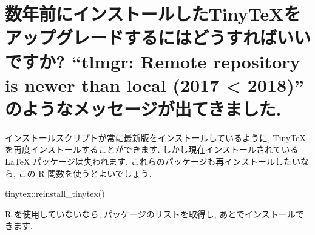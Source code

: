 \documentclass[
  xelatex,ja=standard,jafont=noto]{bxjsreport}
\newenvironment{Shaded}{\begin{snugshade}}{\end{snugshade}}
\newcommand{\AttributeTok}[1]{\textcolor[rgb]{0.77,0.63,0.00}{#1}}
\newcommand{\CommentTok}[1]{\textcolor[rgb]{0.56,0.35,0.01}{\textit{#1}}}
\newcommand{\ExtensionTok}[1]{#1}
\newcommand{\FunctionTok}[1]{\textcolor[rgb]{0.00,0.00,0.00}{#1}}
\newcommand{\KeywordTok}[1]{\textcolor[rgb]{0.13,0.29,0.53}{\textbf{#1}}}
\newcommand{\NormalTok}[1]{#1}
\newcommand{\SpecialCharTok}[1]{\textcolor[rgb]{0.00,0.00,0.00}{#1}}
\newcommand{\StringTok}[1]{\textcolor[rgb]{0.31,0.60,0.02}{#1}}
\newcommand{\VariableTok}[1]{\textcolor[rgb]{0.00,0.00,0.00}{#1}}
\begin{document}
\hypertarget{ux6570ux5e74ux524dux306bux30a4ux30f3ux30b9ux30c8ux30fcux30ebux3057ux305ftinytexux3092ux30a2ux30c3ux30d7ux30b0ux30ecux30fcux30c9ux3059ux308bux306bux306fux3069ux3046ux3059ux308cux3070ux3044ux3044ux3067ux3059ux304b-tlmgr-remote-repository-is-newer-than-local-2017-2018-ux306eux3088ux3046ux306aux30e1ux30c3ux30bbux30fcux30b8ux304cux51faux3066ux304dux307eux3057ux305f.}{%
\section{数年前にインストールしたTinyTeXをアップグレードするにはどうすればいいですか?
``tlmgr: Remote repository is newer than local (2017 \textless{} 2018)''
のようなメッセージが出てきました.}\label{ux6570ux5e74ux524dux306bux30a4ux30f3ux30b9ux30c8ux30fcux30ebux3057ux305ftinytexux3092ux30a2ux30c3ux30d7ux30b0ux30ecux30fcux30c9ux3059ux308bux306bux306fux3069ux3046ux3059ux308cux3070ux3044ux3044ux3067ux3059ux304b-tlmgr-remote-repository-is-newer-than-local-2017-2018-ux306eux3088ux3046ux306aux30e1ux30c3ux30bbux30fcux30b8ux304cux51faux3066ux304dux307eux3057ux305f.}}

インストールスクリプトが常に最新版をインストールしているように, TinyTeX
を再度インストールすることができます. しかし現在インストールされている
LaTeX パッケージは失われます.
これらのパッケージも再インストールしたいなら, この R
関数を使うとよいでしょう.

\begin{Shaded}
\begin{Highlighting}[numbers=left,,]
\NormalTok{tinytex}\SpecialCharTok{::}\FunctionTok{reinstall\_tinytex}\NormalTok{()}
\end{Highlighting}
\end{Shaded}

R を使用していないなら, パッケージのリストを取得し,
あとでインストールできます.

\begin{Shaded}
\end{Shaded}
\end{document}
